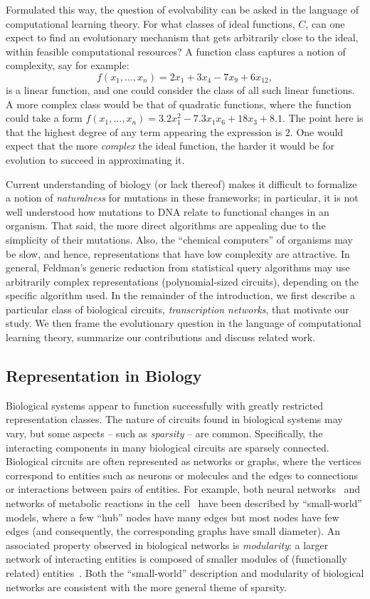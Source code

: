 \documentclass[11pt]{article}
\begin{document}
Formulated this way, the question of evolvability can be asked in the language
of computational learning theory. For what classes of ideal functions, $C$, can
one expect to find an evolutionary mechanism that gets arbitrarily close to the
ideal, within feasible computational resources? A function class captures a
notion of complexity, say for example:
\[ f(x_1, \ldots, x_n) = 2 x_1 + 3 x_4 - 7 x_9 + 6 x_12, \]
is a linear function, and one could consider the class of all such linear
functions. A more complex class would be that of quadratic functions, where the
function could take a form $f(x_1, \ldots, x_n) = 3.2 x_1^2 - 7.3 x_1 x_6 + 18
x_3 + 8.1$. The point here is that the highest degree of any term appearing the
expression is $2$. One would expect that the more \emph{complex} the ideal
function, the harder it would be for evolution to succeed in approximating it.

Current understanding of biology (or lack thereof) makes it
difficult to formalize a notion of \emph{naturalness} for mutations in these
frameworks; in particular, it is not well understood how mutations to DNA
relate to functional changes in an organism. That said, the more direct
algorithms are appealing due to the simplicity of their mutations.  Also, the
``chemical computers'' of organisms may be slow, and hence, representations that
have low complexity are attractive.  In general, Feldman's
generic reduction from statistical query algorithms may use arbitrarily complex
representations (polynomial-sized circuits), depending on the specific algorithm
used.  In the remainder of the introduction, we first describe a particular
class of biological circuits, \emph{transcription networks}, that motivate our
study.  We then frame the evolutionary question in the language of computational
learning theory, summarize our contributions and discuss related work.

\subsection*{Representation in Biology}

Biological systems appear to function successfully with greatly restricted
representation classes. The nature of circuits found in biological systems may
vary, but some aspects -- such as \emph{sparsity} -- are common.  Specifically,
the interacting components in many biological circuits are sparsely connected.
Biological circuits are often represented as networks or graphs, where the
vertices correspond to entities such as neurons or molecules and the edges to
connections or interactions between pairs of entities. For example, both neural
networks~\cite{Watts:1998} and networks of metabolic reactions in the
cell~\cite{Wagner:2001,Barabasi:2000} have been described by ``small-world''
models, where a few ``hub'' nodes have many edges but most nodes have few edges
(and consequently, the corresponding graphs have small diameter).  An associated
property observed in biological networks is \emph{modularity}: a larger network
of interacting entities is composed of smaller modules of (functionally related)
entities~\cite{Hartwell:1999}.  Both the ``small-world'' description and
modularity of biological networks are consistent with the more general theme of
sparsity.
\end{document}
